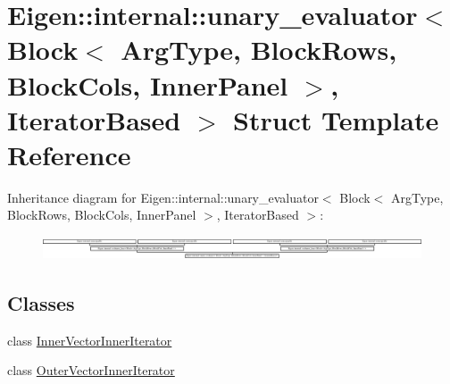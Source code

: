 \hypertarget{struct_eigen_1_1internal_1_1unary__evaluator_3_01_block_3_01_arg_type_00_01_block_rows_00_01_blodb73497179e7c432f93b3052e2754983}{}\section{Eigen\+:\+:internal\+:\+:unary\+\_\+evaluator$<$ Block$<$ Arg\+Type, Block\+Rows, Block\+Cols, Inner\+Panel $>$, Iterator\+Based $>$ Struct Template Reference}
\label{struct_eigen_1_1internal_1_1unary__evaluator_3_01_block_3_01_arg_type_00_01_block_rows_00_01_blodb73497179e7c432f93b3052e2754983}
Inheritance diagram for Eigen\+:\+:internal\+:\+:unary\+\_\+evaluator$<$ Block$<$ Arg\+Type, Block\+Rows, Block\+Cols, Inner\+Panel $>$, Iterator\+Based $>$\+:\begin{figure}[H]
\begin{center}
\leavevmode
\includegraphics[height=0.681818cm]{struct_eigen_1_1internal_1_1unary__evaluator_3_01_block_3_01_arg_type_00_01_block_rows_00_01_blodb73497179e7c432f93b3052e2754983}
\end{center}
\end{figure}
\subsection*{Classes}
\begin{DoxyCompactItemize}
\item 
class \hyperlink{class_eigen_1_1internal_1_1unary__evaluator_3_01_block_3_01_arg_type_00_01_block_rows_00_01_bloc7b8c3454e32b582bbd24168a4ea19a1b}{Inner\+Vector\+Inner\+Iterator}
\item 
class \hyperlink{class_eigen_1_1internal_1_1unary__evaluator_3_01_block_3_01_arg_type_00_01_block_rows_00_01_bloc652d26bcece9990189dc15f4df1c964f}{Outer\+Vector\+Inner\+Iterator}
\end{DoxyCompactItemize}
